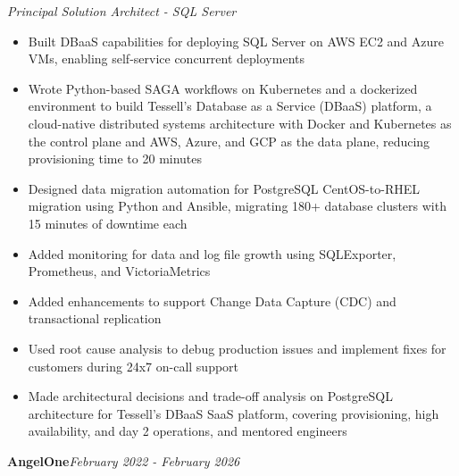 \documentclass[10pt,a4paper]{article}
\begin{document}
\textit{Principal Solution Architect - SQL Server}\\[-5pt]
\begin{itemize}
  \item Built DBaaS capabilities for deploying SQL Server on AWS EC2 and Azure VMs, enabling self-service concurrent deployments
  \item Wrote Python-based SAGA workflows on Kubernetes and a dockerized environment to build Tessell's Database as a Service (DBaaS) platform, a cloud-native distributed systems architecture with Docker and Kubernetes as the control plane and AWS, Azure, and GCP as the data plane, reducing provisioning time to 20 minutes
  \item Designed data migration automation for PostgreSQL CentOS-to-RHEL migration using Python and Ansible, migrating 180+ database clusters with 15 minutes of downtime each
  \item Added monitoring for data and log file growth using SQLExporter, Prometheus, and VictoriaMetrics
  \item Added enhancements to support Change Data Capture (CDC) and transactional replication
  \item Used root cause analysis to debug production issues and implement fixes for customers during 24x7 on-call support
  \item Made architectural decisions and trade-off analysis on PostgreSQL architecture for Tessell's DBaaS SaaS platform, covering provisioning, high availability, and day 2 operations, and mentored engineers
\end{itemize}
\vspace{14.7pt}
\noindent\textbf{AngelOne}\hfill \textit{February 2022 - February 2026}
\end{document}
